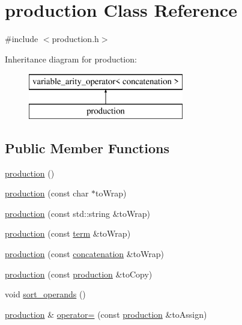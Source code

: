 \hypertarget{classproduction}{}\section{production Class Reference}
\label{classproduction}


{\ttfamily \#include $<$production.\+h$>$}

Inheritance diagram for production\+:\begin{figure}[H]
\begin{center}
\leavevmode
\includegraphics[height=2.000000cm]{classproduction}
\end{center}
\end{figure}
\subsection*{Public Member Functions}
\begin{DoxyCompactItemize}
\item 
\mbox{\hyperlink{classproduction_a3af2c3bd9ccd022413594f9833c27484}{production}} ()
\item 
\mbox{\hyperlink{classproduction_a0325b1a1d63eb61469e269cbd294693b}{production}} (const char $\ast$to\+Wrap)
\item 
\mbox{\hyperlink{classproduction_a54c1f3e403971c8a6ef4e88655e2ee41}{production}} (const std\+::string \&to\+Wrap)
\item 
\mbox{\hyperlink{classproduction_a033cf041abac0ff5a2584d715f95cf30}{production}} (const \mbox{\hyperlink{classterm}{term}} \&to\+Wrap)
\item 
\mbox{\hyperlink{classproduction_a4ca0398b3f433d983dc9fcb753a39d95}{production}} (const \mbox{\hyperlink{classconcatenation}{concatenation}} \&to\+Wrap)
\item 
\mbox{\hyperlink{classproduction_a4aec3b88e42628160b8cd104b73f33a7}{production}} (const \mbox{\hyperlink{classproduction}{production}} \&to\+Copy)
\item 
void \mbox{\hyperlink{classproduction_a7f26dd5ebd1a4913370d0e5f4d506dcc}{sort\+\_\+operands}} ()
\item 
\mbox{\hyperlink{classproduction}{production}} \& \mbox{\hyperlink{classproduction_ae2bd3607ef864c3f348bc25c1c547304}{operator=}} (const \mbox{\hyperlink{classproduction}{production}} \&to\+Assign)
\end{DoxyCompactItemize}
